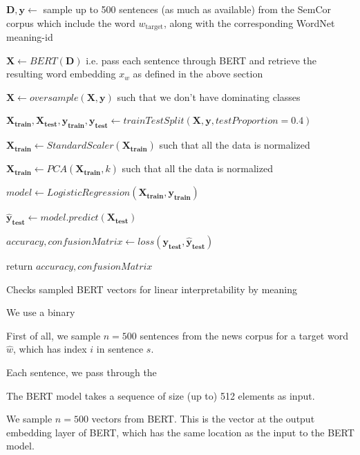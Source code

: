 \documentclass[a4paper,12pt,twoside,openright]{report}
\begin{document}
\begin{algorithm}[H]
\SetAlgoLined
{}
 $\mathbf{D}, \mathbf{y} \leftarrow $  sample up to 500 sentences (as much as available) from the SemCor corpus which include the word $w_{\text{target}}$, along with the corresponding WordNet meaning-id\;

$ \mathbf{X} \leftarrow BERT( \mathbf{D} )$ i.e. pass each sentence through BERT and retrieve the resulting word embedding $x_w$ as defined in the above section\;
 
$ \mathbf{X} \leftarrow oversample( \mathbf{X}, \mathbf{y} )$ such that we don't have dominating classes\;
 
$ \mathbf{X_\text{train}}, \mathbf{X_\text{test}}, \mathbf{y_\text{train}}, \mathbf{y_\text{test}} \leftarrow trainTestSplit( \mathbf{X}, \mathbf{y}, testProportion=0.4 )$ \;

$ \mathbf{X_\text{train}} \leftarrow StandardScaler( \mathbf{X_\text{train}})$ such that all the data is normalized\;

$ \mathbf{X_\text{train}} \leftarrow PCA( \mathbf{X_\text{train}}, k )$ such that all the data is normalized\;

$ model \leftarrow LogisticRegression( \mathbf{X_\text{train}}, \mathbf{y_\text{train}} )$ \;
    
$ \mathbf{\hat{y}_\text{test}} \leftarrow model.predict(\mathbf{X_\text{test}})$ \;

$ accuracy, confusionMatrix \leftarrow loss(\mathbf{y_\text{test}}, \mathbf{\hat{y}_\text{test}}) $ \;
    
return $ accuracy, confusionMatrix $\;
    
 \caption{Checks sampled BERT vectors for linear interpretability by meaning}
\end{algorithm}

We use a binary 

First of all, we sample $n=500$ sentences from the news corpus for a target word $\hat{w}$, which has index $i$ in sentence $s$.

Each sentence, we pass through the 

The BERT model takes a sequence of size (up to) 512 elements as input.

We sample $n=500$ vectors from BERT.
This is the vector at the output embedding layer of BERT, which has the same location as the input to the BERT model.
\end{document}
